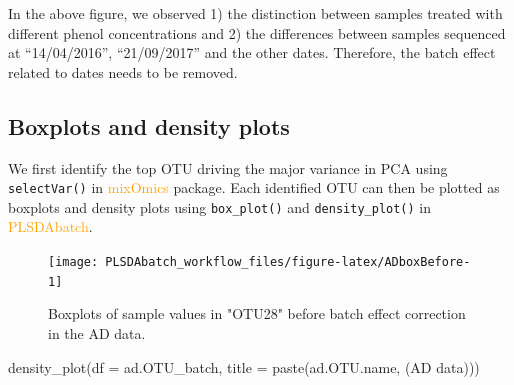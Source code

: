\documentclass[
]{book}
\newenvironment{Shaded}{\begin{snugshade}}{\end{snugshade}}
\newcommand{\AttributeTok}[1]{\textcolor[rgb]{0.77,0.63,0.00}{#1}}
\newcommand{\DecValTok}[1]{\textcolor[rgb]{0.00,0.00,0.81}{#1}}
\newcommand{\FunctionTok}[1]{\textcolor[rgb]{0.00,0.00,0.00}{#1}}
\newcommand{\NormalTok}[1]{#1}
\newcommand{\OtherTok}[1]{\textcolor[rgb]{0.56,0.35,0.01}{#1}}
\newcommand{\SpecialCharTok}[1]{\textcolor[rgb]{0.00,0.00,0.00}{#1}}
\newcommand{\StringTok}[1]{\textcolor[rgb]{0.31,0.60,0.02}{#1}}
\begin{document}
In the above figure, we observed 1) the distinction between samples treated with different phenol concentrations and 2) the differences between samples sequenced at ``14/04/2016'', ``21/09/2017'' and the other dates. Therefore, the batch effect related to dates needs to be removed.

\hypertarget{boxplots-and-density-plots}{%
\subsection{Boxplots and density plots}\label{boxplots-and-density-plots}}

We first identify the top OTU driving the major variance in PCA using \texttt{selectVar()} in \textcolor{orange}{mixOmics} package. Each identified OTU can then be plotted as boxplots and density plots using \texttt{box\_plot()} and \texttt{density\_plot()} in \textcolor{orange}{PLSDAbatch}.

\begin{Shaded}
\end{Shaded}

\begin{figure}

{\centering \texttt{[image: PLSDAbatch\_workflow\_files/figure-latex/ADboxBefore-1]} 

}

\caption{Boxplots of sample values in "OTU28" before batch effect correction in the AD data.}\label{fig:ADboxBefore}
\end{figure}

\begin{Shaded}
\begin{Highlighting}[]
\FunctionTok{density\_plot}\NormalTok{(}\AttributeTok{df =}\NormalTok{ ad.OTU\_batch, }\AttributeTok{title =} \FunctionTok{paste}\NormalTok{(ad.OTU.name, }\StringTok{\textquotesingle{}(AD data)\textquotesingle{}}\NormalTok{))}
\end{Highlighting}
\end{Shaded}
\end{document}

